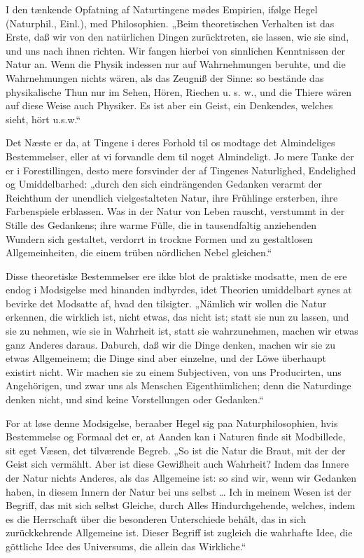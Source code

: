 \documentclass[12pt]{book}
\newcommand{\opage}[1]{\marginnote{\footnotesize\textit{[#1]}}}
\begin{document}
I den tænkende Opfatning af Naturtingene mødes Empirien, ifølge Hegel (Naturphil., Einl.), med
Philosophien. „Beim theoretischen Verhalten ist das Erste, daß wir von den natürlichen Dingen
zurücktreten, sie lassen, wie sie sind, und uns nach ihnen richten. Wir fangen hierbei von sinnlichen
Kenntnissen der Natur an. Wenn die Physik indessen nur auf Wahrnehmungen beruhte, und die
Wahrnehmungen nichts wären, als das Zeugniß der Sinne: so bestände das physikalische Thun nur im
Sehen, Hören, Riechen u. s. w., und die Thiere wären auf diese Weise auch Physiker. Es ist aber ein
Geist, ein Denkendes, welches sieht, hört u.s.w.“

Det Næste er da, at Tingene i deres Forhold til os modtage det Almindeliges Bestemmelser, eller at vi
forvandle dem til noget Almindeligt. Jo mere Tanke der er i Forestillingen, desto mere forsvinder der
af Tingenes Naturlighed, Endelighed og Umiddelbarhed: „durch den sich eindrängenden Gedanken verarmt
der Reichthum der unendlich vielgestalteten Natur, ihre Frühlinge ersterben, ihre Farbenspiele
erblassen. Was in der Natur von Leben rauscht, verstummt in der Stille des Gedankens; ihre warme
Fülle, die in tausendfaltig anziehenden Wundern sich gestaltet, verdorrt in trockne Formen und zu
gestaltlosen Allgemeinheiten, die einem trüben nördlichen Nebel gleichen.“

Disse theoretiske Bestemmelser ere ikke blot de praktiske modsatte, men de ere endog i Modsigelse med
hinanden indbyrdes, idet Theorien umiddelbart synes at bevirke det Modsatte af, hvad den tilsigter.
„Nämlich wir wollen die Natur erkennen, die wirklich ist, nicht etwas, das nicht ist; statt sie nun
zu lassen, und sie zu nehmen, wie sie in Wahrheit ist, statt sie wahrzunehmen, machen wir etwas ganz
Anderes daraus. Daburch, daß wir die Dinge denken, machen wir sie zu etwas Allgemeinem; die Dinge sind
aber einzelne,
\opage{193} und der Löwe überhaupt existirt nicht. Wir machen sie zu einem Subjectiven, von uns Producirten, uns
Angehörigen, und zwar uns als Menschen Eigenthümlichen; denn die Naturdinge denken nicht, und sind
keine Vorstellungen oder Gedanken.“

For at løse denne Modsigelse, beraaber Hegel sig paa Naturphilosophien, hvis Bestemmelse og Formaal
det er, at Aanden kan i Naturen finde sit Modbillede, sit eget Væsen, det tilværende Begreb. „So ist
die Natur die Braut, mit der der Geist sich vermählt. Aber ist diese Gewißheit auch Wahrheit? Indem
das Innere der Natur nichts Anderes, als das Allgemeine ist: so sind wir, wenn wir Gedanken haben, in
diesem Innern der Natur bei uns selbst \ldots{} Ich in meinem Wesen ist der Begriff, das mit sich
selbst Gleiche, durch Alles Hindurchgehende, welches, indem es die Herrschaft über die besonderen
Unterschiede behält, das in sich zurückkehrende Allgemeine ist. Dieser Begriff ist zugleich die
wahrhafte Idee, die göttliche Idee des Universums, die allein das Wirkliche.“
\end{document}
